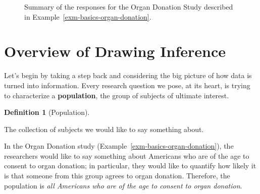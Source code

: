\documentclass[
  letterpaper,
  DIV=11,
  numbers=noendperiod]{scrreprt}
\theoremstyle{plain}
\theoremstyle{definition}
\theoremstyle{definition}
\newtheorem{definition}{Definition}[chapter]
\theoremstyle{remark}
\begin{document}
\begin{figure}


\caption{\label{fig-basics-organ-plot}Summary of the responses for the
Organ Donation Study described in
Example~\ref{exm-basics-organ-donation}.}

\end{figure}%

\section{Overview of Drawing
Inference}\label{overview-of-drawing-inference}

Let's begin by taking a step back and considering the big picture of how
data is turned into information. Every research question we pose, at its
heart, is trying to characterize a \textbf{population}, the group of
subjects of ultimate interest.

\begin{definition}[Population]\protect\hypertarget{def-population}{}\label{def-population}

The collection of subjects we would like to say something about.

\end{definition}

In the Organ Donation study (Example~\ref{exm-basics-organ-donation}),
the researchers would like to say something about Americans who are of
the age to consent to organ donation; in particular, they would like to
quantify how likely it is that someone from this group agrees to organ
donation. Therefore, the population is \emph{all Americans who are of
the age to consent to organ donation}.
\end{document}
